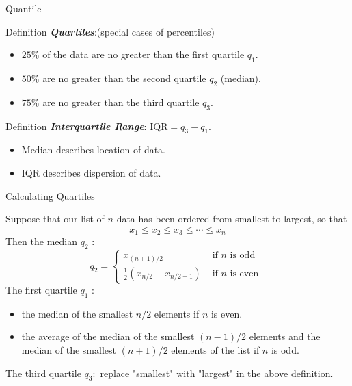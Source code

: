 \documentclass{beamer}
\newcommand{\bb}[1]{\textcolor{antiquefuchsia}{\textbf{\textit{#1}}}}
\begin{document}
\begin{frame}{Quantile}
\begin{block}{Definition}
\bb{Quartiles}:(special cases of percentiles)
\begin{itemize}
\item $25 \%$ of the data are no greater than the first quartile $q_{1}$.
\item $50 \%$ are no greater than the second quartile $q_{2}$ (median).
\item $75 \%$ are no greater than the third quartile $q_{3}$.
\end{itemize}
\end{block}
\begin{block}{Definition}
\bb{Interquartile Range}: $\mathrm{IQR}=q_{3}-q_{1}$.
\begin{itemize}
\item Median describes location of data.
\item IQR describes dispersion of data.
\end{itemize}
\end{block}
\end{frame}

\begin{frame}{Calculating Quartiles}

Suppose that our list of $n$ data has been ordered from smallest to largest, so that
$$
x_{1} \leq x_{2} \leq x_{3} \leq \cdots \leq x_{n}
$$
Then the median $q_{2}$ :
$$
q_{2}= \begin{cases}x_{(n+1) / 2} & \text { if } n \text { is odd } \\ \frac{1}{2}\left(x_{n / 2}+x_{n / 2+1}\right) & \text { if } n \text { is even }\end{cases}
$$
The first quartile $q_{1}$ :
\begin{itemize}
\item the median of the smallest $n / 2$ elements if $n$ is even.
\item the average of the median of the smallest $(n-1) / 2$ elements and the median of the smallest $(n+1) / 2$ elements of the list if $n$ is odd.
\end{itemize}
The third quartile $q_{3}:$ replace "smallest" with "largest" in the above definition.

\end{frame}
\end{document}
